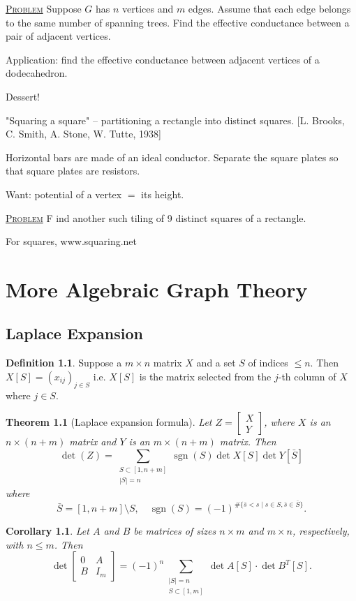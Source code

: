 \documentclass{report}
\def \sgn {\operatorname{sgn}}
\newcommand{\fancyem}[1]{\underline{\textsc{#1}}}
\newtheorem{theorem}{Theorem}[section]
\newtheorem{corollary}{Corollary}[section]
\theoremstyle{definition}
\newtheorem{definition}{Definition}[section]
\theoremstyle{remark}
\numberwithin{equation}{section}
\begin{document}
\fancyem{Problem} Suppose $G$ has $n$ vertices and $m$ edges. Assume that each edge belongs to the same number of spanning trees. Find the effective conductance between a pair of adjacent vertices.

Application: find the effective conductance between adjacent vertices of a dodecahedron.

Dessert!

"Squaring a square" -- partitioning a rectangle into distinct squares. [L. Brooks, C. Smith, A. Stone, W. Tutte, 1938]

Horizontal bars are made of an ideal conductor. Separate the square plates so that square plates are resistors.

Want: potential of a vertex $=$ its height.

\fancyem{Problem} F
ind another such tiling of 9 distinct squares of a rectangle.

For squares, www.squaring.net

\chapter{More Algebraic Graph Theory}

\section{Laplace Expansion}
\begin{definition}
    Suppose a $m \times n$ matrix $X$ and a set $S$ of indices $\leq n$. Then $X[S] = (x_{ij})_{j \in S}$ i.e. $X[S]$ is the matrix selected from the $j$-th column of $X$ where $j \in S$.
\end{definition}

\begin{theorem}[Laplace expansion formula]
    Let $Z = \begin{bmatrix}
        X \\
        Y
    \end{bmatrix}$, where $X$ is an $n \times (n + m)$ matrix and $Y$ is an $m \times (n + m)$ matrix. Then \[\det (Z) = \sum_{\substack{S \subset [1, n + m] \\ |S| = n}} \sgn(S) \det X[S]\det Y[\bar{S}]\]
    where \[\bar{S} = [1, n + m] \setminus S, \quad \sgn(S) = (-1)^{\#\{\bar{s} < s \mid s \in S, \bar{s} \in \bar{S}\}}.\]
\end{theorem}

\begin{corollary}
    Let $A$ and $B$ be matrices of sizes $n \times m$ and $m \times n$, respectively, with $n \leq m$. Then \[
        \det \begin{bmatrix}
            0 & A \\
            B & I_m
        \end{bmatrix} = (-1)^n\sum_{\substack{|S| = n \\ S \subset [1, m]}} \det A[S] \cdot \det B^T[S].   
    \]
\end{corollary}
\end{document}
